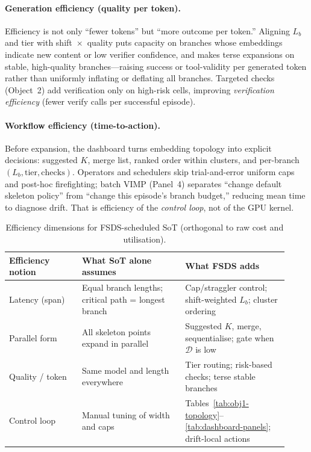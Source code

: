 \documentclass[11pt]{article}
\newcommand{\VIMP}{\mathrm{VIMP}}
\begin{document}
\paragraph{Generation efficiency (quality per token).} Efficiency is not only
``fewer tokens'' but ``more outcome per token.'' Aligning $L_b$ and tier with
shift~$\times$~quality puts capacity on branches whose embeddings indicate new
content or low verifier confidence, and makes terse expansions on stable,
high-quality branches---raising success or tool-validity per generated token
rather than uniformly inflating or deflating all branches. Targeted checks
(Object~2) add verification only on high-risk cells, improving \emph{verification
efficiency} (fewer verify calls per successful episode).

\paragraph{Workflow efficiency (time-to-action).} Before expansion, the dashboard
turns embedding topology into explicit decisions: suggested $K$, merge list,
ranked order within clusters, and per-branch $(L_b,\mathrm{tier},\mathrm{checks})$.
Operators and schedulers skip trial-and-error uniform caps and post-hoc firefighting;
batch $\VIMP$ (Panel~4) separates ``change default skeleton policy'' from
``change this episode's branch budget,'' reducing mean time to diagnose drift.
That is efficiency of the \emph{control loop}, not of the GPU kernel.

\begin{table}[t]
\centering
\small
\caption{Efficiency dimensions for FSDS-scheduled SoT (orthogonal to raw cost and
utilisation).}
\label{tab:sot-efficiency}
\begin{tabular}{@{}p{0.24\linewidth}p{0.34\linewidth}p{0.34\linewidth}@{}}
\toprule
Efficiency notion & What SoT alone assumes & What FSDS adds \\
\midrule
Latency (span) &
Equal branch lengths; critical path = longest branch &
Cap/straggler control; shift-weighted $L_b$; cluster ordering \\
Parallel form &
All skeleton points expand in parallel &
Suggested $K$, merge, sequentialise; gate when $\mathcal{D}$ is low \\
Quality / token &
Same model and length everywhere &
Tier routing; risk-based checks; terse stable branches \\
Control loop &
Manual tuning of width and caps &
Tables~\ref{tab:obj1-topology}--\ref{tab:dashboard-panels}; drift-local actions \\
\bottomrule
\end{tabular}
\end{table}
\end{document}
